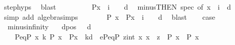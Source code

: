 \begin{isabellebody}
\ step{\isachardot}{\kern0pt}hyps\ \isamarkupfalse%
\ blast\isanewline
\ \ \ \ \isamarkupfalse%
\ \isamarkupfalse%
\ {\isachardoublequoteopen}{\isasymdots}\ {\isasymlongrightarrow}\ P{\isacharparenleft}{\kern0pt}x\ {\isacharminus}{\kern0pt}\ {\isacharparenleft}{\kern0pt}i\ {\isacharplus}{\kern0pt}\ {}{\isacharparenright}{\kern0pt}\ {\isacharasterisk}{\kern0pt}\ d{\isacharparenright}{\kern0pt}{\isachardoublequoteclose}\ \isamarkupfalse%
\ minus{\isacharbrackleft}{\kern0pt}THEN\ spec{\isacharcomma}{\kern0pt}\ of\ {\isachardoublequoteopen}x\ {\isacharminus}{\kern0pt}\ i\ {\isacharasterisk}{\kern0pt}\ d{\isachardoublequoteclose}{\isacharbrackright}{\kern0pt}\isanewline
\ \ \ \ \ \ \isamarkupfalse%
\ {\isacharparenleft}{\kern0pt}simp\ add{\isacharcolon}{\kern0pt}\ algebra{\isacharunderscore}{\kern0pt}simps{\isacharparenright}{\kern0pt}\isanewline
\ \ \ \ \isamarkupfalse%
\ \isamarkupfalse%
\ {\isachardoublequoteopen}P\ x\ {\isasymlongrightarrow}\ P{\isacharparenleft}{\kern0pt}x\ {\isacharminus}{\kern0pt}\ {\isacharparenleft}{\kern0pt}i\ {\isacharplus}{\kern0pt}\ {}{\isacharparenright}{\kern0pt}\ {\isacharasterisk}{\kern0pt}\ d{\isacharparenright}{\kern0pt}{\isachardoublequoteclose}\ \isamarkupfalse%
\ blast\isacommand{{\isacharbraceright}{\kern0pt}}\isamarkupfalse%
\isanewline
\ \ \isamarkupfalse%
\ {\isacharquery}{\kern0pt}case\ \isacommand{{\isachardot}{\kern0pt}{\isachardot}{\kern0pt}}\isamarkupfalse%
\isanewline
{}\isamarkupfalse%
%
\endisatagproof
{\isafoldproof}%
%
\isadelimproof
\isanewline
%
\endisadelimproof
\isanewline
{}\isamarkupfalse%
\ \ minusinfinity{\isacharcolon}{\kern0pt}\isanewline
\ \ \ dpos{\isacharcolon}{\kern0pt}\ {\isachardoublequoteopen}{}\ {\isacharless}{\kern0pt}\ d{\isachardoublequoteclose}\ \isanewline
\ \ \ \ P{}eqP{}{\isacharcolon}{\kern0pt}\ {\isachardoublequoteopen}{\isasymforall}x\ k{\isachardot}{\kern0pt}\ P{}\ x\ {\isacharequal}{\kern0pt}\ P{}{\isacharparenleft}{\kern0pt}x\ {\isacharminus}{\kern0pt}\ k{\isacharasterisk}{\kern0pt}d{\isacharparenright}{\kern0pt}{\isachardoublequoteclose}\ \ ePeqP{}{\isacharcolon}{\kern0pt}\ {\isachardoublequoteopen}{\isasymexists}z{\isacharcolon}{\kern0pt}{\isacharcolon}{\kern0pt}int{\isachardot}{\kern0pt}\ {\isasymforall}x{\isachardot}{\kern0pt}\ x\ {\isacharless}{\kern0pt}\ z\ {\isasymlongrightarrow}\ {\isacharparenleft}{\kern0pt}P\ x\ {\isacharequal}{\kern0pt}\ P{}\ x{\isacharparenright}{\kern0pt}{\isachardoublequoteclose}\isanewline

\end{isabellebody}
